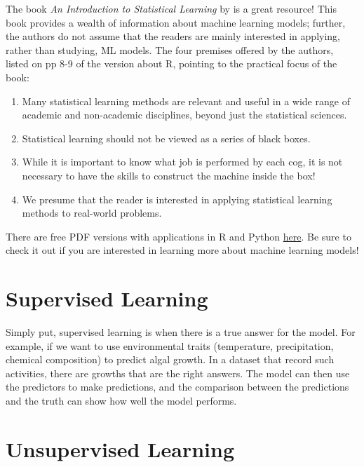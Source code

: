 \documentclass[
]{book}
\providecommand{\tightlist}{%
  \setlength{\itemsep}{0pt}\setlength{\parskip}{0pt}}
\begin{document}
The book \emph{An Introduction to Statistical Learning} by \citet{james2013introduction} is a great resource! This book provides a wealth of information about machine learning models; further, the authors do not assume that the readers are mainly interested in applying, rather than studying, ML models. The four premises offered by the authors, listed on pp 8-9 of the version about R, pointing to the practical focus of the book:

\begin{enumerate}
\def\labelenumi{\arabic{enumi}.}
\tightlist
\item
  Many statistical learning methods are relevant and useful in a wide range of academic and non-academic disciplines, beyond just the statistical sciences.
\item
  Statistical learning should not be viewed as a series of black boxes.
\item
  While it is important to know what job is performed by each cog, it is not necessary to have the skills to construct the machine inside the box!
\item
  We presume that the reader is interested in applying statistical learning methods to real-world problems.
\end{enumerate}

There are free PDF versions with applications in R and Python \href{https://www.statlearning.com/}{here}. Be sure to check it out if you are interested in learning more about machine learning models!

\hypertarget{supervised-learning}{%
\section{Supervised Learning}\label{supervised-learning}}

Simply put, supervised learning is when there is a true answer for the model. For example, if we want to use environmental traits (temperature, precipitation, chemical composition) to predict algal growth. In a dataset that record such activities, there are growths that are the right answers. The model can then use the predictors to make predictions, and the comparison between the predictions and the truth can show how well the model performs.

\hypertarget{unsupervised-learning}{%
\section{Unsupervised Learning}\label{unsupervised-learning}}
\end{document}
